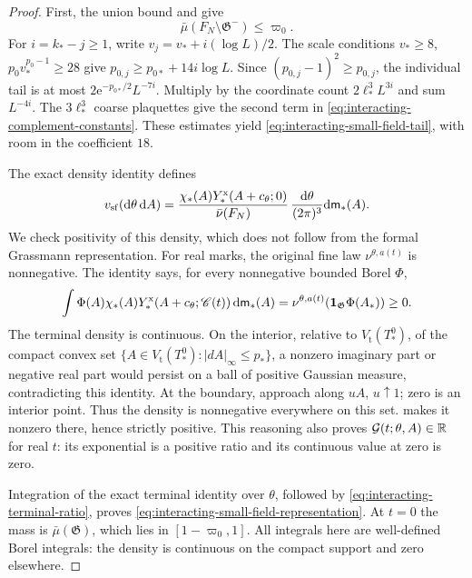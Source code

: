 \begin{proof}
First, the union bound and
\cite[(7)]{TerminalPressure} give
\begin{equation}\label{eq:interacting-small-field-tail}
 \bar\mu(F_N\setminus\mathfrak G^-)\le\varpi_0 .
\end{equation}
For $i=k_*-j\ge1$, write
$v_j=v_*+i(\log L)/2$.
The scale conditions
$v_*\ge8$, $p_0v_*^{p_0-1}\ge28$ give
$p_{0,j}\ge p_{0*}+14i\log L$.
Since $(p_{0,j}-1)^2\ge p_{0,j}$,
the individual tail is at most
$2\mathrm e^{-p_{0*}/2}L^{-7i}$.
Multiply by the coordinate count
$2\ell_*^3L^{3i}$ and sum $L^{-4i}$.
The $3\ell_*^3$ coarse plaquettes give the
second term in \eqref{eq:interacting-complement-constants}.
These estimates yield \eqref{eq:interacting-small-field-tail},
with room in the coefficient $18$.

The exact density identity defines
\begin{equation}\label{eq:interacting-small-field-measure}
 v_{\rm sf}(\mathrm d\theta\,\mathrm d A)=
   \frac{\chi_*(A)Y_*^{\rm x}(A+c_\theta;0)}
             {\bar\nu(F_N)}\,\frac{\mathrm d\theta}{(2\pi)^3}
                                      \mathrm d\mathsf m_*(A).
\end{equation}
We check positivity of this density, which
does not follow from the formal Grassmann
representation. For real marks, the original
fine law $\nu^{\theta,a(t)}$ is nonnegative.
The identity \cite[(21)]{TerminalPressure} says, for every
nonnegative bounded Borel $\Phi$,
\[
 \int\Phi(A)\chi_*(A)Y_*^{\rm x}(A+c_\theta;\mathscr C(t))
                \,\mathrm d\mathsf m_*(A)
       =\nu^{\theta,a(t)}(\mathbf1_{\mathfrak G}\Phi(A_*))\ge0.
\]
The terminal density is continuous. On the
interior, relative to $V_{\mathrm t}(T_*^0)$, of the compact
convex set $\{A\in V_{\mathrm t}(T_*^0):|dA|_\infty\le p_*\}$, a
nonzero imaginary part or negative real
part would persist on a ball of positive
Gaussian measure, contradicting this identity.
At the boundary, approach along $uA$,
$u\uparrow1$; zero is an interior point.
Thus the density is nonnegative everywhere
on this set. 
makes it nonzero there, hence strictly positive.
This reasoning also proves
$\mathcal G(t;\theta,A)\in\mathbb R$ for real $t$:
its exponential is a positive ratio and its
continuous value at zero is zero.

Integration of the exact terminal identity over
$\theta$, followed by
\eqref{eq:interacting-terminal-ratio}, proves
\eqref{eq:interacting-small-field-representation}.
At $t=0$ the mass is $\bar\mu(\mathfrak G)$,
which lies in $[1-\varpi_0,1]$.
All integrals here are well-defined Borel
integrals: the density is continuous on
the compact support and zero elsewhere.


\end{proof}
